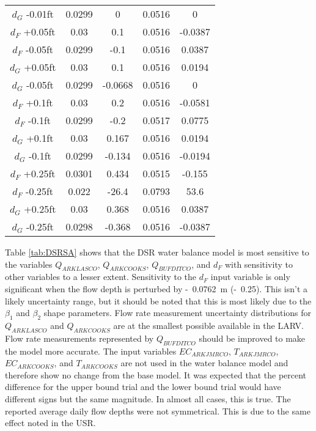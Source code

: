 \begin{spacing}{1.0}
\begin{center}
\begin{longtable}{ccccc}
			$d_{G} $ -0.01ft & 0.0299 & 0 & 0.0516 & 0 \\
			$d_{F} $ +0.05ft & 0.03 & 0.1 & 0.0516 & -0.0387 \\
			$d_{F} $ -0.05ft & 0.0299 & -0.1 & 0.0516 & 0.0387 \\
			$d_{G} $ +0.05ft & 0.03 & 0.1 & 0.0516 & 0.0194 \\
			$d_{G} $ -0.05ft & 0.0299 & -0.0668 & 0.0516 & 0 \\
			$d_{F} $ +0.1ft & 0.03 & 0.2 & 0.0516 & -0.0581 \\
			$d_{F} $ -0.1ft & 0.0299 & -0.2 & 0.0517 & 0.0775 \\
			$d_{G} $ +0.1ft & 0.03 & 0.167 & 0.0516 & 0.0194 \\
			$d_{G} $ -0.1ft & 0.0299 & -0.134 & 0.0516 & -0.0194 \\
			$d_{F} $ +0.25ft & 0.0301 & 0.434 & 0.0515 & -0.155 \\
			$d_{F} $ -0.25ft & 0.022 & -26.4 & 0.0793 & 53.6 \\
			$d_{G} $ +0.25ft & 0.03 & 0.368 & 0.0516 & 0.0387 \\
			$d_{G} $ -0.25ft & 0.0298 & -0.368 & 0.0516 & -0.0387 \\
			\bottomrule
		\end{longtable}%
	\end{center}
\end{spacing}

Table \ref{tab:DSRSA} shows that the DSR water balance model is most sensitive to the variables $ Q_{ARKLASCO} $, $ Q_{ARKCOOKS} $, $ Q_{BUFDITCO} $, and $ d_F $ with sensitivity to other variables to a lesser extent.  Sensitivity to the $ d_F $ input variable is only significant when the flow depth is perturbed by \SI{0.0762}[-]{\meter} (\SI{0.25}[-]{\foot}).  This isn't a likely uncertainty range, but it should be noted that this is most likely due to the $ \beta_1 $ and $ \beta_2 $ shape parameters.  Flow rate measurement uncertainty distributions for $ Q_{ARKLASCO} $ and $ Q_{ARKCOOKS} $ are at the smallest possible available in the LARV.  Flow rate measurements represented by $ Q_{BUFDITCO} $ should be improved to make the model more accurate.  The input variables $ EC_{ARKJMRCO} $, $ T_{ARKJMRCO} $, $ EC_{ARKCOOKS} $, and $ T_{ARKCOOKS} $ are not used in the water balance model and therefore show no change from the base model.  It was expected that the percent difference for the upper bound trial and the lower bound trial would have different signs but the same magnitude.  In almost all cases, this is true.  The reported average daily flow depths were not symmetrical.  This is due to the same effect noted in the USR.

